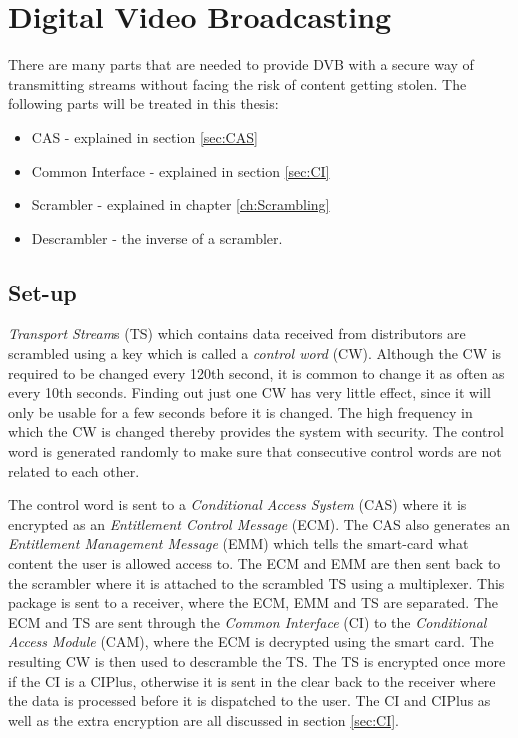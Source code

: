 \chapter{Digital Video Broadcasting}
There are many parts that are needed to provide DVB with a secure way of 
transmitting streams without facing the risk of content getting stolen. The 
following parts will be treated in this thesis:

\begin{itemize}
\item CAS - explained in section \ref{sec:CAS}
\item Common Interface - explained in section \ref{sec:CI}
\item Scrambler - explained in chapter \ref{ch:Scrambling}
\item Descrambler - the inverse of a scrambler.
\end{itemize}

\section{Set-up} \label{sec:setup}
\emph{Transport Stream}s (TS) which contains data received from distributors are 
scrambled using a key which is called a \emph{control word} (CW). Although the CW
is required to be changed every 120th second, it is common to change it as often 
as every 10th seconds. Finding out just one CW has very little effect, since it 
will only be usable for a few seconds before it is changed. The high frequency in
which the CW is changed thereby provides the system with security. The control 
word is generated randomly to make sure that consecutive control words are not 
related to each other.

The control word is sent to a \emph{Conditional Access System} (CAS) where it is 
encrypted as an \emph{Entitlement Control Message} (ECM). The CAS also generates 
an \emph{Entitlement Management Message} (EMM) which tells the smart-card what 
content the user is allowed access to. The ECM and EMM are then sent back to the 
scrambler where it is attached to the scrambled TS using a multiplexer. This 
package is sent to a receiver, where the ECM, EMM and TS are separated. The 
ECM and TS are sent through the \emph{Common Interface} (CI) to the 
\emph{Conditional Access Module} (CAM), where the ECM is decrypted using the 
smart card. The resulting CW is then used to descramble the TS. The TS is 
encrypted once more if the CI is a CIPlus, otherwise it is sent in the clear 
back to the receiver where the data is processed before it is dispatched to the 
user. The CI and CIPlus as well as the extra encryption are all discussed in 
section \ref{sec:CI}.

